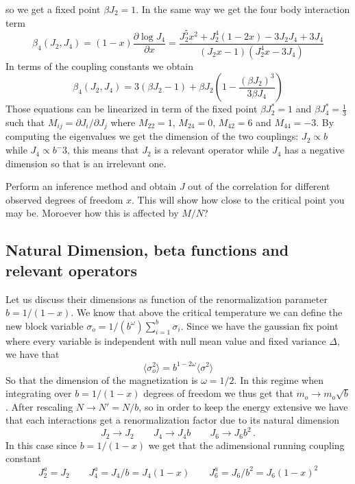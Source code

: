 \documentclass[aps,pre,noshowpacs]{revtex4}
\begin{document}
so we get a fixed point $\beta J_2=1$. In the same way we get the four body interaction term
\begin{equation}
\beta_4(J_2, J_4) = (1-x) \frac{\partial \log J_4}{\partial x} =\frac{J_2^5 x^2+J_2^4 (1-2 x)-3 J_2 J_4+3 J_4}{(J_2 x-1) \left(J_2^4 x-3 J_4 \right)}\end{equation}
In terms of the coupling constants we obtain 
\begin{equation}\label{eq2:flux}
\beta_4(J_2, J_4)  =    3 (\beta J_2 -1)+ \beta J_2\left(1-\frac{(\beta J_2)^3}{3\beta J_4} \right) 
\end{equation}
Those equations can be linearized in term of the fixed point $\beta J_2^*=1$ and $\beta J_4^*=\frac{1}{3}$ such that $M_{ij}=\partial J_i/\partial J_j$
where $M_{22}=1$, $M_{24}=0$, $M_{42}=6$ and $M_{44}=-3$. By computing the eigenvalues we get the dimension of the two couplings:  $J_2 \propto b$ while $J_4\propto b^-3$, this means that $J_2$ is a relevant operator while $J_4$ has a negative dimension so that is an irrelevant one.

Perform an inference method and obtain $J$ out of the correlation for different observed degrees of freedom $x$. This will show how close to the critical point you may be.
Moroever how this is affected by $M/N$?


\subsection{Natural Dimension, beta functions and relevant operators}

Let us discuss their dimensions as function of the renormalization parameter $b=1/(1-x)$. We know that above the critical temperature
we can define the new block variable $\sigma_o=1/(b^{\omega}) \sum_{i=1}^{b} \sigma_i $. Since we have the gaussian fix point  where every variable is independent with null mean value and fixed variance $\Delta$, we have that $$\langle \sigma_o^2\rangle = b^{1-2 \omega} \langle \sigma^2\rangle $$ So that the dimension of the magnetization is $\omega=1/2$. In this regime when integrating over $b=1/(1-x)$ degrees of freedom we thus get that $m_o \to m_o \sqrt{b}$. After rescaling $N \to N'= N /b$, so in order to keep the energy extensive  we have that each interactions get a renormalization factor due to its natural dimension
$$J_2 \to J_2  \qquad J_4 \to  J_4 b \qquad J_6 \to J_6 b^2\,.$$
In this case since $b=1/(1-x)$ we get that the adimensional running coupling constant $$J^a_2=J_2 \qquad J^a_4=J_4 / b=J_4 (1-x) \qquad J^a_6=J_6 /b^2=J_6(1-x)^2$$
\end{document}
